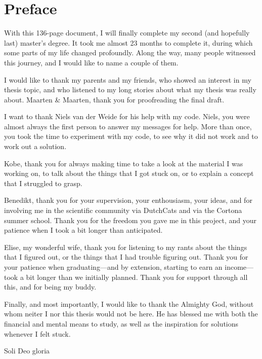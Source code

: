 \chapter{\label{chap:Preface}Preface}

With this 136-page document, I will finally complete my second (and hopefully last) master's degree. It took me almost 23 months to complete it, during which some parts of my life changed profoundly. Along the way, many people witnessed this journey, and I would like to name a couple of them.

I would like to thank my parents and my friends, who showed an interest in my thesis topic, and who listened to my long stories about what my thesis was really about.
Maarten \& Maarten, thank you for proofreading the final draft.

I want to thank Niels van der Weide for his help with my code. Niels, you were almost always the first person to answer my messages for help. More than once, you took the time to experiment with my code, to see why it did not work and to work out a solution.

Kobe, thank you for always making time to take a look at the material I was working on, to talk about the things that I got stuck on, or to explain a concept that I struggled to grasp.

Benedikt, thank you for your supervision, your enthousiasm, your ideas, and for involving me in the scientific community via DutchCats and via the Cortona summer school. Thank you for the freedom you gave me in this project, and your patience when I took a bit longer than anticipated.

Elise, my wonderful wife, thank you for listening to my rants about the things that I figured out, or the things that I had trouble figuring out. Thank you for your patience when graduating---{}and by extension, starting to earn an income---{}took a bit longer than we initially planned. Thank you for support through all this, and for being my buddy.

Finally, and most importantly, I would like to thank the Almighty God, without whom neiter I nor this thesis would not be here. He has blessed me with both the financial and mental means to study, as well as the inspiration for solutions whenever I felt stuck.

\newpage

\thispagestyle{empty}

\vspace*{\fill}
\begin{center}
    Soli Deo gloria
\end{center}
\vspace*{\fill}
